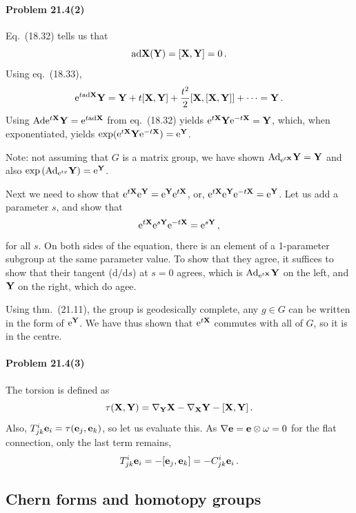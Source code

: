 \documentclass[a4paper,12pt]{article}
\def\d{\mathrm{d}}
\def\e{\mathrm{e}}
\newcommand{\problem}[1]{\paragraph{Problem #1}}
\begin{document}

\problem{21.4(2)} Eq.\ (18.32) tells us that
\[
 {\rm ad}{\bf X}({\bf Y}) = [{\bf X}, {\bf Y}] = 0\,.
\]
Using eq.\ (18.33),
\[
 \e^{t{\rm ad}{\bf X}}{\bf Y}  = {\bf Y} + t[{\bf X}, {\bf Y}] + \frac{t^2}{2}[{\bf X}, [{\bf X}, {\bf Y}]]+\dots = {\bf Y}\,.
\]
Using ${\rm Ad}\e^{t\bf X}{\bf Y} = \e^{t{\rm ad}\bf X}$ from eq.\ (18.32) yields $\e^{t\bf X} {\bf Y}\e^{-t\bf X} = {\bf Y}$, which, when exponentiated, yields $\exp(\e^{t\bf X} {\bf Y}\e^{-t\bf X})=\e^{\bf Y}$.

Note: not assuming that $G$ is a matrix group, we have shown ${\rm Ad}_{\e^{t\bf X}}{\bf Y} = {\bf Y}$ and also $\exp \left({\rm Ad}_{\e^{tx}}{\bf Y}\right) = \e^{\bf Y}$.

Next we need to show that $\e^{t\bf X}\e^{\bf Y} = \e^{\bf Y}\e^{t\bf X}$, or, $\e^{t\bf X}\e^{\bf Y}\e^{-t\bf X} = \e^{\bf Y}$. Let us add a parameter $s$, and show that
\[
 \e^{t\bf X}\e^{s\bf Y}\e^{-t\bf X} = \e^{s\bf Y}\,,
\]
for all $s$. On both sides of the equation, there is an element of a 1-parameter subgroup at the same parameter value. To show that they agree, it suffices to show that their tangent ($\d/\d s$) at $s=0$ agrees, which is ${\rm Ad}_{\e^{t\bf X}}{\bf Y}$ on the left, and ${\bf Y}$ on the right, which do agee.

Using thm.\ (21.11), the group is geodesically complete, any $g\in G$ can be written in the form of $\e^{\bf Y}$. We have thus shown that $\e^{t\bf X}$ commutes with all of $G$, so it is in the centre.


\problem{21.4(3)} The torsion is defined as
\[
 \tau({\bf X}, {\bf Y}) = \nabla_{\bf Y}{\bf X}-\nabla_{\bf X}{\bf Y}-[{\bf X}, {\bf Y}]\,.
\]
Also, $T^i_{jk}{\bf e}_i = \tau({\bf e}_j, {\bf e}_k)$, so let us evaluate this. As $\nabla{\bf e} ={\bf e}\otimes \omega =0$ for the flat connection, only the last term remains,
\[
 T^{i}_{jk}{\bf e}_i = -[{\bf e}_j, {\bf e}_k] = -C^i_{jk}{\bf e}_i\,.
\]


\subsection{Chern forms and homotopy groups}

\end{document}

